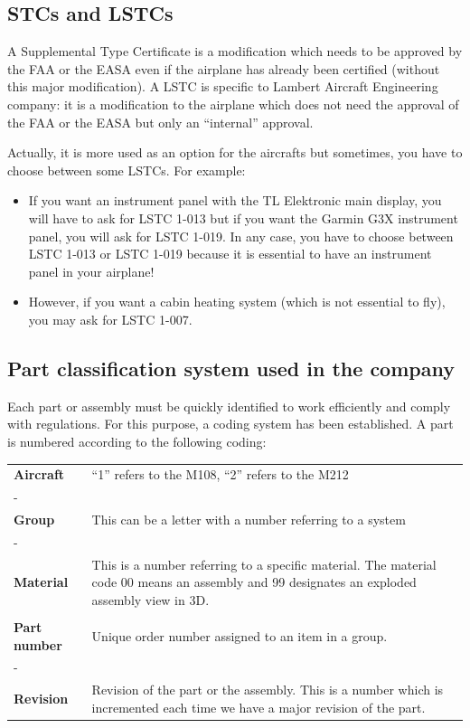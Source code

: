 \documentclass[11pt,a4paper]{article}
\begin{document}
\subsection{STCs and LSTCs}
\label{subsec:LSTC}
A Supplemental Type Certificate is a modification which needs to be approved by the FAA or the EASA even if the airplane has already been certified (without this major modification). A LSTC is specific to Lambert Aircraft Engineering company: it is a modification to the airplane which does not need the approval of the FAA or the EASA but only an ``internal'' approval.

\bigskip

Actually, it is more used as an option for the aircrafts but sometimes, you have to choose between some LSTCs. For example:
\begin{itemize}
\item If you want an instrument panel with the TL Elektronic main display, you will have to ask for LSTC 1-013 but if you want the Garmin G3X instrument panel, you will ask for LSTC 1-019. In any case, you have to choose between LSTC 1-013 or LSTC 1-019 because it is essential to have an instrument panel in your airplane!
\item However, if you want a cabin heating system (which is not essential to fly), you may ask for LSTC 1-007.
\end{itemize}

\subsection{Part classification system used in the company}
\label{subsec:partnumber}

Each part or assembly must be quickly identified to work efficiently and comply with regulations. For this purpose, a coding system has been established. A part is numbered according to the following coding:

\begin{center}
\begin{tabular}{p{3cm} p{12cm}}
\textbf{Aircraft} & ``1'' refers to the M108, ``2'' refers to the M212 \tabularnewline
- \tabularnewline
\textbf{Group} & This can be a letter with a number referring to a system \tabularnewline
- \tabularnewline
\textbf{Material} & This is a number referring to a specific material.  The material code 00 means an assembly and 99 designates an exploded assembly view in 3D. \tabularnewline
\tabularnewline
\textbf{Part number} & Unique order number assigned to an item in a group. \tabularnewline
- \tabularnewline
\textbf{Revision} & Revision of the part or the assembly. This is a number which is incremented each time we have a major revision of the part. \tabularnewline
\end{tabular}
\end{center}
\end{document}
